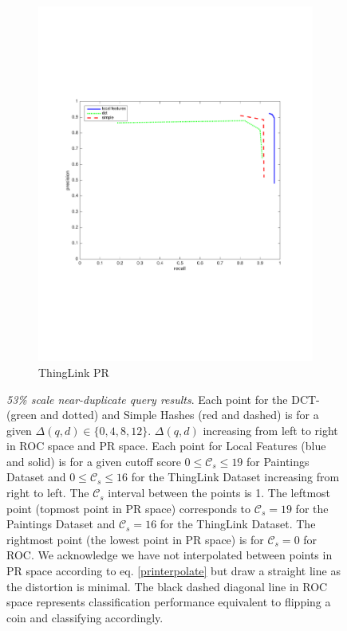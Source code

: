 \documentclass[english,12pt,a4paper,pdftex,elec,utf8, table]{aaltothesis}
\begin{document}
\begin{figure}[htb]
\begin{center}
\begin{subfigure}[b]{0.49\textwidth}
    \includegraphics[width=\textwidth]{figures/thinglink_53scalePR.pdf}
    \caption{ThingLink PR}
    \label{53prthinglink}
  \end{subfigure}
  \caption{\emph{53\% scale near-duplicate query results}. Each point for the DCT- (green and dotted) and Simple Hashes (red and dashed) is for a given $\Delta(q,d) \in \{0,4,8,12\}$. $\Delta(q,d)$ increasing from left to right in ROC space and PR space. Each point for Local Features (blue and solid) is for a given cutoff score $0 \leq \mathcal{C}_s \leq 19$ for Paintings Dataset and $0 \leq \mathcal{C}_s \leq 16$ for the ThingLink Dataset increasing from right to left. The $\mathcal{C}_s$ interval between the points is 1. The leftmost point (topmost point in PR space) corresponds to $\mathcal{C}_s=19$ for the Paintings Dataset and $\mathcal{C}_s=16$ for the ThingLink Dataset. The rightmost point (the lowest point in PR space) is for $\mathcal{C}_s = 0$ for ROC. We acknowledge we have not interpolated between points in PR space according to eq. \ref{printerpolate} but draw a straight line as the distortion is minimal. The black dashed diagonal line in ROC space represents classification performance equivalent to flipping a coin and classifying accordingly.\label{53label}}
  \end{center}

\end{figure}
\end{document}
